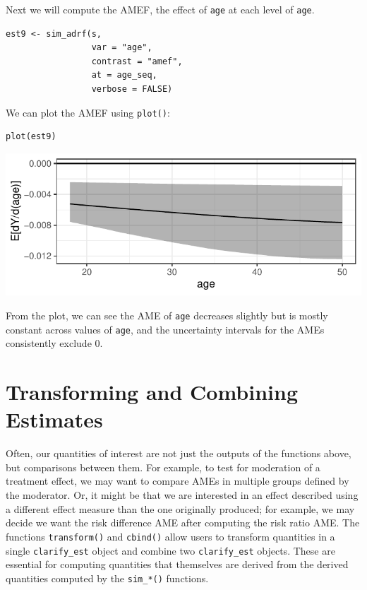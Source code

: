 Next we will compute the AMEF, the effect of \texttt{age} at each level of \texttt{age}.

\begin{verbatim}
est9 <- sim_adrf(s,
                 var = "age",
                 contrast = "amef",
                 at = age_seq,
                 verbose = FALSE)
\end{verbatim}

We can plot the AMEF using \texttt{plot()}:

\begin{verbatim}
plot(est9)
\end{verbatim}

\begin{center}\includegraphics{figures/plot9-1} \end{center}

From the plot, we can see the AME of \texttt{age} decreases slightly but is mostly constant across values of \texttt{age}, and the uncertainty intervals for the AMEs consistently exclude 0.

\hypertarget{transforming-and-combining-estimates}{%
\section{Transforming and Combining Estimates}\label{transforming-and-combining-estimates}}

Often, our quantities of interest are not just the outputs of the functions above, but comparisons between them. For example, to test for moderation of a treatment effect, we may want to compare AMEs in multiple groups defined by the moderator. Or, it might be that we are interested in an effect described using a different effect measure than the one originally produced; for example, we may decide we want the risk difference AME after computing the risk ratio AME. The functions \texttt{transform()} and \texttt{cbind()} allow users to transform quantities in a single \texttt{clarify\_est} object and combine two \texttt{clarify\_est} objects. These are essential for computing quantities that themselves are derived from the derived quantities computed by the \texttt{sim\_*()} functions.

